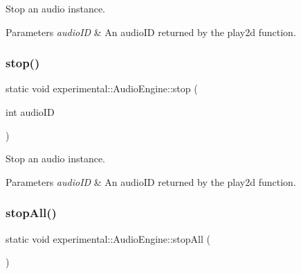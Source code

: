 Stop an audio instance.


\begin{DoxyParams}{Parameters}
{\em audio\+ID} & An audio\+ID returned by the play2d function. \\
\hline
\end{DoxyParams}
\mbox{\label{classexperimental_1_1AudioEngine_a932422ecf6818ac5e81e4530e556fd1e}} 
\subsubsection{\texorpdfstring{stop()}{stop()}\hspace{0.1cm}{\footnotesize\ttfamily [2/2]}}
{\footnotesize\ttfamily static void experimental\+::\+Audio\+Engine\+::stop (\begin{DoxyParamCaption}\item[{int}]{audio\+ID }\end{DoxyParamCaption})\hspace{0.3cm}{\ttfamily [static]}}

Stop an audio instance.


\begin{DoxyParams}{Parameters}
{\em audio\+ID} & An audio\+ID returned by the play2d function. \\
\hline
\end{DoxyParams}
\mbox{\label{classexperimental_1_1AudioEngine_a911b9b9c56cf769fd561334870533d13}} 
\subsubsection{\texorpdfstring{stop\+All()}{stopAll()}\hspace{0.1cm}{\footnotesize\ttfamily [1/2]}}
{\footnotesize\ttfamily static void experimental\+::\+Audio\+Engine\+::stop\+All (\begin{DoxyParamCaption}{ }\end{DoxyParamCaption})\hspace{0.3cm}{\ttfamily [static]}}

